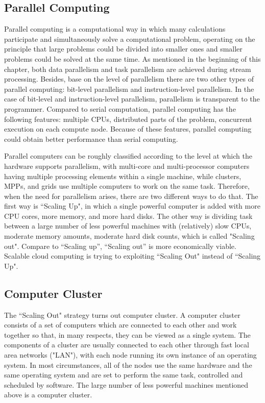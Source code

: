 \subsection{Parallel Computing}
\label{subsection:parallel_computing}
Parallel computing is a computational way in which many calculations participate and simultaneously solve a computational problem, operating on the principle that large problems could be divided into smaller ones and smaller problems could be solved at the same time. As mentioned in the beginning of this chapter, both data parallelism and task parallelism are achieved during stream processing. Besides, base on the level of parallelism there are two other types of parallel computing: bit-level parallelism and instruction-level parallelism. In the case of bit-level and instruction-level parallelism, parallelism is transparent to the programmer. Compared to serial computation, parallel computing has the following features: multiple CPUs, distributed parts of the problem, concurrent execution on each compute node. Because of these features, parallel computing could obtain better performance than serial computing. 

Parallel computers can be roughly classified according to the level at which the hardware supports parallelism, with multi-core and multi-processor computers having multiple processing elements within a single machine, while clusters, MPPs, and grids use multiple computers to work on the same task. Therefore, when the need for parallelism arises, there are two different ways to do that. The first way is ``Scaling Up", in which a single powerful computer is added with more CPU cores, more memory, and more hard disks. The other way is dividing task between a large number of less powerful machines with (relatively) slow CPUs, moderate memory amounts, moderate hard disk counts, which is called "Scaling out". Compare to ``Scaling up'', ``Scaling out'' is more economically viable. Scalable cloud computing is trying to exploiting ``Scaling Out" instead of ``Scaling Up".

\subsection{Computer Cluster}
\label{subsection:computing_cluster}
The ``Scaling Out" strategy turns out computer cluster. A computer cluster consists of a set of computers which are connected to each other and work together so that, in many respects, they can be viewed as a single system. The components of a cluster are usually connected to each other through fast local area networks ("LAN"), with each node running its own instance of an operating system. In most circumstances, all of the nodes use the same hardware and the same operating system and are set to perform the same task, controlled and scheduled by software. The large number of less powerful machines mentioned above is a computer cluster.

